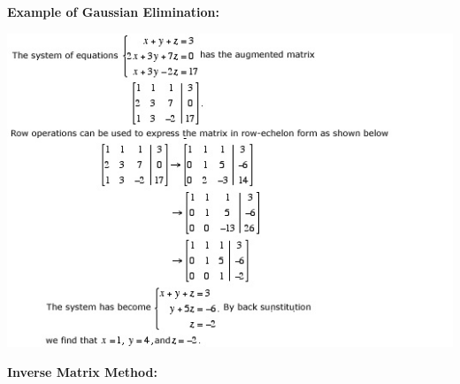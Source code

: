 \documentclass[12pt]{article}
\begin{document}
\textbf{Example of Gaussian Elimination:}

\centerline{\includegraphics{GaussianElimination.jpg}}

\newpage

\textbf{Inverse Matrix Method:}
\end{document}

